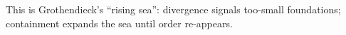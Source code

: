 This is Grothendieck's ``rising sea'': divergence signals too-small
foundations; containment expands the sea until order re-appears.

